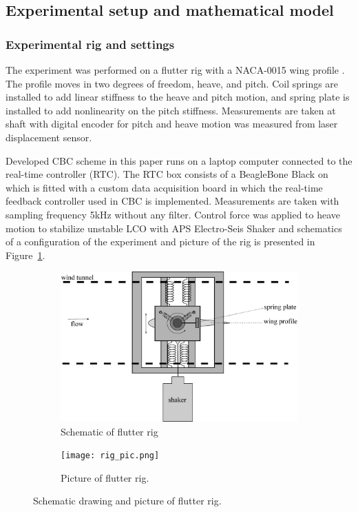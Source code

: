 \documentclass[openacc]{rsproca_new}%
\newcommand{\Fref}[1]{Figure~\ref{#1}}
\begin{document}
\subsection{Experimental setup and mathematical model}\label{model}
\subsubsection{Experimental rig and settings}\label{setup}
The experiment was performed on a flutter rig with a NACA-0015 wing profile \cite{jacobs1933characteristics}. The profile moves in two degrees of freedom, heave, and pitch. Coil springs are installed to add linear stiffness to the heave and pitch motion, and spring plate is installed to add nonlinearity on the pitch stiffness. Measurements are taken at shaft with digital encoder for pitch and heave motion was measured from laser displacement sensor.

Developed CBC scheme in this paper runs on a laptop computer connected to the real-time controller (RTC). The RTC box consists of a BeagleBone Black on which is fitted with a custom data acquisition board \cite{rtc2} in which the real-time feedback controller used in CBC is implemented. Measurements are taken with sampling frequency  5kHz without any filter.  Control force was applied to heave motion to stabilize unstable LCO with APS Electro-Seis Shaker and schematics of a configuration of the experiment and picture of the rig is presented in \Fref{f:rig}.

\begin{figure}
  \centering
  \begin{subfigure}[b]{0.5\linewidth}
    \includegraphics[width=\linewidth]{flutter_rig.eps}
    \caption{Schematic of flutter rig}
  \end{subfigure}
  \begin{subfigure}[b]{0.45\linewidth}
    \texttt{[image: rig\_pic.png]}
    \caption{Picture of flutter rig.}
  \end{subfigure}
  \caption{Schematic drawing and picture of flutter rig.}
  \label{f:rig}
\end{figure}
\end{document}
